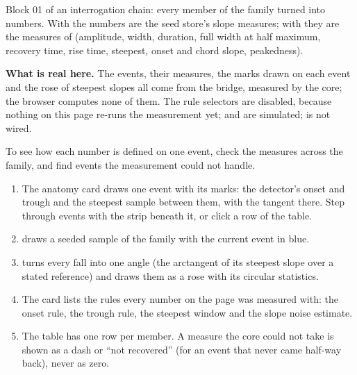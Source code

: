 Block 01 of an interrogation chain: every member of the family turned into numbers. With
 the numbers are the seed store's slope measures; with 
they are the measures of  (amplitude, width, duration, full
width at half maximum, recovery time, rise time, steepest, onset and chord slope, peakedness).

\textbf{What is real here.} The events, their measures, the marks drawn on each event and the
rose of steepest slopes all come from the bridge, measured by the core; the browser computes none
of them. The rule selectors are disabled, because nothing on this page re-runs the measurement
yet;  and  are simulated;  is not wired.

To see how each number is defined on one event, check the measures across the family, and find
events the measurement could not handle.


\begin{enumerate}
  \item The anatomy card draws one event with its marks: the detector's onset and trough and the
        steepest sample between them, with the tangent there. Step through events with the strip
        beneath it, or click a row of the table.
  \item {} draws a seeded sample of the family with the current event in blue.
  \item {} turns every fall into one angle (the arctangent of its
        steepest slope over a stated reference) and draws them as a rose with its circular
        statistics.
  \item The  card lists the rules every number on the page was measured with: the onset
        rule, the trough rule, the steepest window and the slope noise estimate.
  \item The  table has one row per member. A measure the core could not
        take is shown as a dash or ``not recovered'' (for an event that never came half-way back),
        never as zero.
\end{enumerate}

